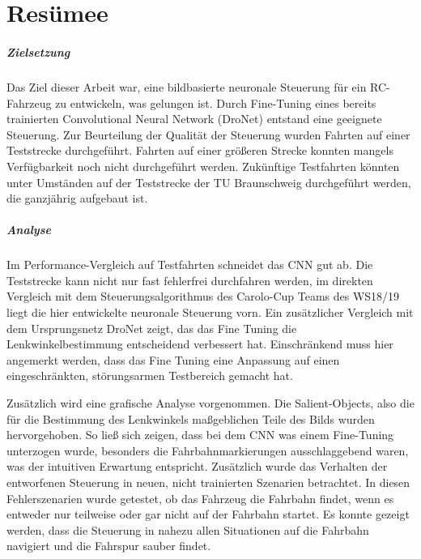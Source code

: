 %
\chapter{Resümee}

\paragraph{Zielsetzung}
Das Ziel dieser Arbeit war, eine bildbasierte neuronale Steuerung für ein RC-Fahrzeug zu entwickeln, was gelungen ist. Durch Fine-Tuning eines bereits trainierten Convolutional Neural Network (DroNet) entstand eine geeignete Steuerung. Zur Beurteilung der Qualität der Steuerung wurden Fahrten auf einer Teststrecke durchgeführt. Fahrten auf einer größeren Strecke konnten mangels Verfügbarkeit noch nicht durchgeführt werden. Zukünftige Testfahrten könnten unter Umständen auf der Teststrecke der TU Braunschweig durchgeführt werden, die ganzjährig aufgebaut ist.

\paragraph{Analyse}
Im Performance-Vergleich auf Testfahrten schneidet das CNN gut ab. Die Teststrecke kann nicht nur fast fehlerfrei durchfahren werden, im direkten Vergleich mit dem Steuerungsalgorithmus des Carolo-Cup Teams des WS18/19 liegt die hier entwickelte neuronale Steuerung vorn. Ein zusätzlicher Vergleich mit dem Ursprungsnetz DroNet zeigt, das das Fine Tuning die Lenkwinkelbestimmung entscheidend verbessert hat. Einschränkend muss hier angemerkt werden, dass das Fine Tuning eine Anpassung auf einen eingeschränkten, störungsarmen Testbereich gemacht hat.

Zusätzlich wird eine grafische Analyse vorgenommen. Die Salient-Objects, also die für die Bestimmung des Lenkwinkels maßgeblichen Teile des Bilds wurden hervorgehoben. So ließ sich zeigen, dass bei dem CNN was einem Fine-Tuning unterzogen wurde, besonders die Fahrbahnmarkierungen ausschlaggebend waren, was der intuitiven Erwartung entspricht. Zusätzlich wurde das Verhalten der entworfenen Steuerung in neuen, nicht trainierten Szenarien betrachtet. In diesen Fehlerszenarien wurde getestet, ob das Fahrzeug die Fahrbahn findet, wenn es entweder nur teilweise oder gar nicht auf der Fahrbahn startet. Es konnte gezeigt werden, dass die Steuerung in nahezu allen Situationen auf die Fahrbahn navigiert und die Fahrspur sauber findet.

